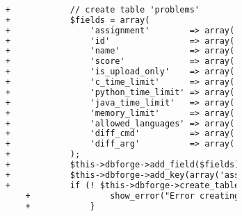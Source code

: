 \begin{lstlisting}[language=diff, caption=Perubahan pada kode Install.php]
						
						+            // create table 'problems'
						+            $fields = array(
						+                'assignment'        => array('type' => 'SMALLINT', 'constraint' => 4, 'unsigned' => true),
						+                'id'                => array('type' => 'SMALLINT', 'constraint' => 4, 'unsigned' => true),
						+                'name'              => array('type' => 'VARCHAR', 'constraint' => 50, 'default' => ''),
						+                'score'             => array('type' => 'INT', 'constraint' => 11),
						+                'is_upload_only'    => array('type' => 'TINYINT', 'constraint' => 1, 'default' => '0'),
						+                'c_time_limit'      => array('type' => 'INT', 'constraint' => 11, 'unsigned' => true, 'default' => 500),
						+                'python_time_limit' => array('type' => 'INT', 'constraint' => 11, 'unsigned' => true, 'default' => 1500),
						+                'java_time_limit'   => array('type' => 'INT', 'constraint' => 11, 'unsigned' => true, 'default' => 2000),
						+                'memory_limit'      => array('type' => 'INT', 'constraint' => 11, 'unsigned' => true, 'default' => 50000),
						+                'allowed_languages' => array('type' => 'TEXT'),
						+                'diff_cmd'          => array('type' => 'VARCHAR', 'constraint' => 20, 'default' => 'diff'),
						+                'diff_arg'          => array('type' => 'VARCHAR', 'constraint' => 20, 'default' => '-bB'),
						+            );
						+            $this->dbforge->add_field($fields);
						+            $this->dbforge->add_key(array('assignment', 'id'));
						+            if (! $this->dbforge->create_table('problems', true)) {
							+                show_error("Error creating database table ".$this->db->dbprefix('problems'));
							+            }
						

\end{lstlisting}
